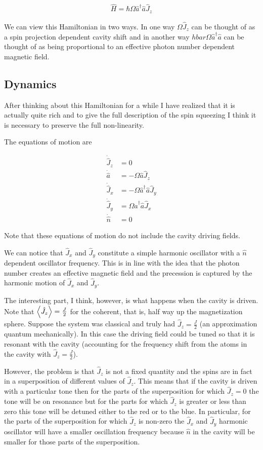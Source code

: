 \documentclass[12pt]{article}
\begin{document}
\begin{align}
\hat{H} = \hbar \Omega \hat{a}^{\dag} \hat{a} \hat{J}_z
\end{align}

We can view this Hamiltonian in two ways. In one way $\Omega \hat{J}_z$ can be thought of as a spin projection dependent cavity shift and in another way $hbar \Omega \hat{a}^{\dag} \hat{a}$ can be thought of as being proportional to an effective photon number dependent magnetic field. 

\subsection{Dynamics}

After thinking about this Hamiltonian for a while I have realized that it is actually quite rich and to give the full description of the spin squeezing I think it is necessary to preserve the full non-linearity.

The equations of motion are

\begin{align}
\dot{\hat{J}}_z &= 0\\
\dot{\hat{a}} &= -\Omega \hat{a} \hat{J}_z\\
\dot{\hat{J}}_x &= -\Omega \hat{a}^{\dag}\hat{a} \hat{J}_y\\
\dot{\hat{J}}_y &= \Omega \hat{a}^{\dag}\hat{a} \hat{J}_x\\
\dot{\hat{n}} &= 0 
\end{align}

Note that these equations of motion do not include the cavity driving fields.

We can notice that $\hat{J}_x$ and $\hat{J}_y$ constitute a simple harmonic oscillator with a $\hat{n}$ dependent oscillator frequency. This is in line with the idea that the photon number creates an effective magnetic field and the precession is captured by the harmonic motion of $\hat{J}_x$ and $\hat{J}_y$.

The interesting part, I think, however, is what happens when the cavity is driven. Note that $\Braket{\hat{J}_z} = \frac{J}{2}$ for the coherent, that is, half way up the magnetization sphere. Suppose the system was classical and truly had $\hat{J}_z = \frac{J}{2}$ (an approximation quantum mechanically). In this case the driving field could be tuned so that it is resonant with the cavity (accounting for the frequency shift from the atoms in the cavity with $\hat{J}_z = \frac{J}{2}$). 

However, the problem is that $\hat{J}_z$ is not a fixed quantity and the spins are in fact in a superposition of different values of $\hat{J}_z$. This means that if the cavity is driven with a particular tone then for the parts of the superposition for which $\hat{J}_z = 0$ the tone will be on resonance but for the parts for which $\hat{J}_z$ is greater or less than zero this tone will be detuned either to the red or to the blue. In particular, for the parts of the superposition for which $\hat{J}_z$ is non-zero the $\hat{J}_x$ and $\hat{J}_y$ harmonic oscillator will have a smaller oscillation frequency because $\hat{n}$ in the cavity will be smaller for those parts of the superposition.
\end{document}
